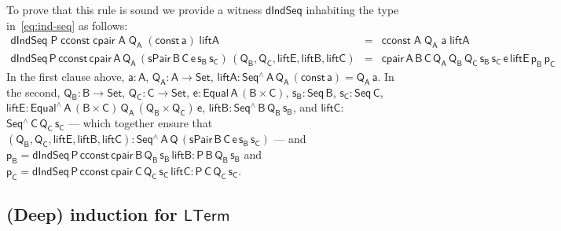 \documentclass[9pt]{entcs}
\begin{document}
To prove that this rule is sound we provide a witness
$\mathsf{dIndSeq}$ inhabiting the type in~\eqref{eq:ind-seq} as
follows:
\[\begin{array}{lll}
\mathsf{dIndSeq\;P\;cconst\;cpair\;A\;Q_A\;(const\,a)\;liftA}  &
    = &  \mathsf{cconst\;A\;Q_A\;a\;liftA}\\
\mathsf{dIndSeq\,P\,cconst\,cpair\,A\,Q_A\,(sPair\,B\,C\,e\,s_B\,s_C)\,
    (Q_B,Q_C, liftE, liftB, liftC)}  & = &
\mathsf{cpair\,A\,B\,C\,Q_A\,Q_B\,Q_C\,s_B\,s_C\,e\,liftE\,p_B\,p_C}
\end{array}\]
In the first clause ahove, $\mathsf{a : A}$, $\mathsf{Q_A : A \to
  Set}$, $\mathsf{liftA : Seq^{\wedge}\,A\,Q_A\,(const\,a) =
  Q_A\,a}$. In the second, $\mathsf{Q_B : B \to Set}$, $\mathsf{Q_C :
  C \to Set}$, $\mathsf{e : Equal\,A\,(B \times C)}$, $\mathsf{s_B :
  Seq\,B}$, $\mathsf{s_C : Seq\,C}$, $\mathsf{liftE :
  Equal^{\wedge}\,A\, (B \times C)\, Q_A\, (Q_B \times Q_C) \, e}$,
$\mathsf{liftB : Seq^{\wedge}\,B\,Q_B\,s_B}$, and $\mathsf{liftC :}$
$\mathsf{Seq^{\wedge}\,C\,Q_C\,s_C}$ --- which together ensure that
$\mathsf{(Q_B, Q_C, liftE, liftB, liftC) :
  Seq^{\wedge}\,A\,Q\,(sPair\,B\,C\,e\,s_B\,s_C)}$ --- and
$\mathsf{p_B} =\mathsf{dIndSeq\,P\,cconst\,cpair\,B\,Q_B\,s_B\,liftB :
  P\,B\,Q_B\,s_B}$ and $\mathsf{p_C}
=\mathsf{dIndSeq\,P\,cconst\,cpair\,C\,Q_C\,s_C\,liftC :
  P\,C\,Q_C\,s_C}$.

\subsection{(Deep) induction for $\mathsf{LTerm}$}\label{sec:ind-lam} 
\end{document}
